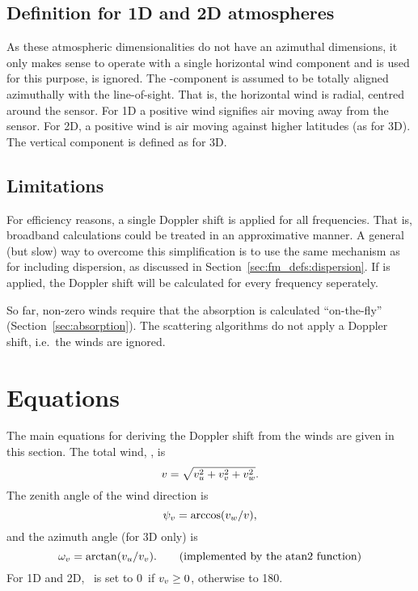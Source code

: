\subsection{Definition for 1D and 2D atmospheres}
%
As these atmospheric dimensionalities do not have an azimuthal dimensions, it
only makes sense to operate with a single horizontal wind component and
 is used for this purpose, 
is ignored. The \WindSN-component is assumed to be totally aligned azimuthally
with the line-of-sight. That is, the horizontal wind is radial, centred around
the sensor. For 1D a positive wind signifies air moving away from the sensor.
For 2D, a positive wind is air moving against higher latitudes (as for 3D).
The vertical component is defined as for 3D.
 

\subsection{Limitations}
\label{sec:winds:limitations}
%
For efficiency reasons, a single Doppler shift is applied for all frequencies.
That is, broadband calculations could be treated in an approximative manner. A
general (but slow) way to overcome this simplification is to use the same
mechanism as for including dispersion, as discussed in
Section~\ref{sec:fm_defs:dispersion}. If  is
applied, the Doppler shift will be calculated for every frequency seperately.


So far, non-zero winds require that the absorption is calculated ``on-the-fly''
(Section~\ref{sec:absorption}). The scattering algorithms do not apply a
Doppler shift, i.e.\ the winds are ignored. 



\section{Equations}
\label{sec:winds:eqs}

The main equations for deriving the Doppler shift from the winds are given in
this section. The total wind, \Wind, is
\begin{equation}
  v = \sqrt{v_u^2+v_v^2+v_w^2}.
  \label{eq:winds:total}
\end{equation}
The zenith angle of the wind direction is 
\begin{equation}
  \psi_{v} = \arccos(v_w/v),
  \label{eq:winds:za}
\end{equation}
and the azimuth angle (for 3D only) is 
\begin{equation}
  \aAzmAng{\Wind} = \arctan(\WindWE/\WindSN). \qquad 
                           \mathrm{(implemented\ by\ the\ atan2\ function)}
  \label{eq:winds:aa}
\end{equation}
For 1D and 2D, \aAzmAng{\Wind}\ is set to 0\degree\ if $v_v \geq 0$,
otherwise to 180\degree. 

